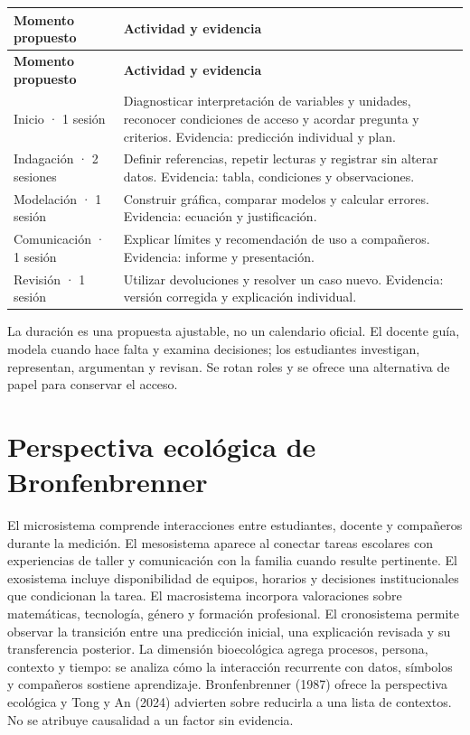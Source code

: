 \documentclass[spanish,letterpaper,oneside]{article}
\begin{document}
{\small{}\renewcommand{\arraystretch}{1.25}
\begin{longtable}{|>{\raggedright\arraybackslash}p{}|>{\raggedright\arraybackslash}p{}|}\hline
\rowcolor{iiiepePale} \textbf{Momento propuesto} & \textbf{Actividad y evidencia} \\\hline
\endfirsthead
\hline
\rowcolor{iiiepePale} \textbf{Momento propuesto} & \textbf{Actividad y evidencia} \\\hline
\endhead
Inicio · 1 sesión & Diagnosticar interpretación de variables y unidades, reconocer condiciones de acceso y acordar pregunta y criterios. Evidencia: predicción individual y plan. \\\hline
Indagación · 2 sesiones & Definir referencias, repetir lecturas y registrar sin alterar datos. Evidencia: tabla, condiciones y observaciones. \\\hline
Modelación · 1 sesión & Construir gráfica, comparar modelos y calcular errores. Evidencia: ecuación y justificación. \\\hline
Comunicación · 1 sesión & Explicar límites y recomendación de uso a compañeros. Evidencia: informe y presentación. \\\hline
Revisión · 1 sesión & Utilizar devoluciones y resolver un caso nuevo. Evidencia: versión corregida y explicación individual. \\\hline
\end{longtable}}


La duración es una propuesta ajustable, no un calendario oficial. El docente guía, modela cuando hace falta y examina decisiones; los estudiantes investigan, representan, argumentan y revisan. Se rotan roles y se ofrece una alternativa de papel para conservar el acceso.
\section{Perspectiva ecológica de Bronfenbrenner}
El microsistema comprende interacciones entre estudiantes, docente y compañeros durante la medición. El mesosistema aparece al conectar tareas escolares con experiencias de taller y comunicación con la familia cuando resulte pertinente. El exosistema incluye disponibilidad de equipos, horarios y decisiones institucionales que condicionan la tarea. El macrosistema incorpora valoraciones sobre matemáticas, tecnología, género y formación profesional. El cronosistema permite observar la transición entre una predicción inicial, una explicación revisada y su transferencia posterior.
La dimensión bioecológica agrega procesos, persona, contexto y tiempo: se analiza cómo la interacción recurrente con datos, símbolos y compañeros sostiene aprendizaje. Bronfenbrenner (1987) ofrece la perspectiva ecológica y Tong y An (2024) advierten sobre reducirla a una lista de contextos. No se atribuye causalidad a un factor sin evidencia.
\end{document}
